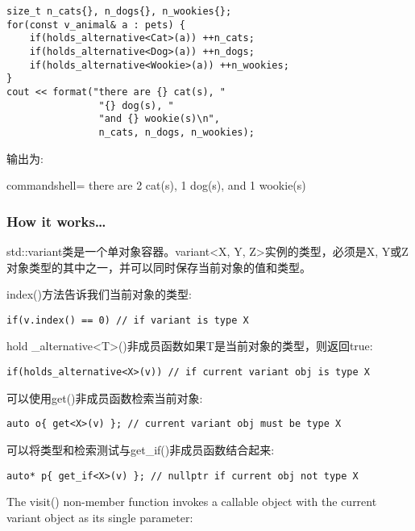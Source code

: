 \begin{itemize}
\begin{lstlisting}[style=styleCXX]
size_t n_cats{}, n_dogs{}, n_wookies{};
for(const v_animal& a : pets) {
	if(holds_alternative<Cat>(a)) ++n_cats;
	if(holds_alternative<Dog>(a)) ++n_dogs;
	if(holds_alternative<Wookie>(a)) ++n_wookies;
}
cout << format("there are {} cat(s), "
				"{} dog(s), "
				"and {} wookie(s)\n",
				n_cats, n_dogs, n_wookies);
\end{lstlisting}

输出为:

\begin{tcblisting}{commandshell={}}
there are 2 cat(s), 1 dog(s), and 1 wookie(s)
\end{tcblisting}
\end{itemize}

\subsubsection{How it works…}

std::variant类是一个单对象容器。variant<X, Y, Z>实例的类型，必须是X, Y或Z对象类型的其中之一，并可以同时保存当前对象的值和类型。

index()方法告诉我们当前对象的类型:

\begin{lstlisting}[style=styleCXX]
if(v.index() == 0) // if variant is type X
\end{lstlisting}

hold \_alternative<T>()非成员函数如果T是当前对象的类型，则返回true:

\begin{lstlisting}[style=styleCXX]
if(holds_alternative<X>(v)) // if current variant obj is type X
\end{lstlisting}

可以使用get()非成员函数检索当前对象:

\begin{lstlisting}[style=styleCXX]
auto o{ get<X>(v) }; // current variant obj must be type X
\end{lstlisting}

可以将类型和检索测试与get\_if()非成员函数结合起来:

\begin{lstlisting}[style=styleCXX]
auto* p{ get_if<X>(v) }; // nullptr if current obj not type X
\end{lstlisting}

The visit() non-member function invokes a callable object with the current variant object as its single parameter:

